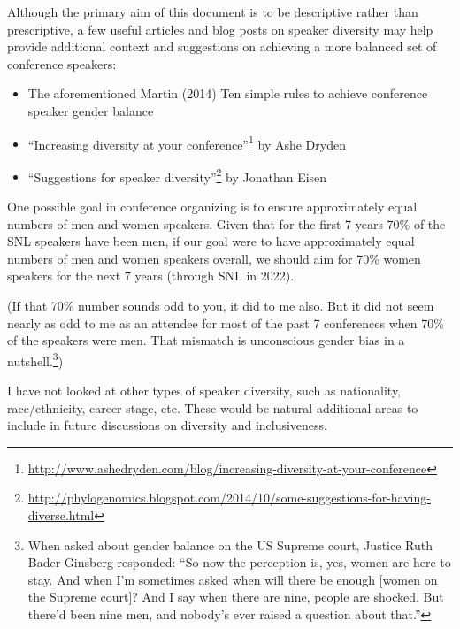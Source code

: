 \documentclass{winnower}
\begin{document}
Although the primary aim of this document is to be descriptive rather than prescriptive, a few useful articles and blog posts on speaker diversity may help provide additional context and suggestions on achieving a more balanced set of conference speakers:

\begin{itemize}

\item The aforementioned Martin (2014) Ten simple rules to achieve conference speaker gender balance
\item ``Increasing diversity at your conference''\footnote{\url{http://www.ashedryden.com/blog/increasing-diversity-at-your-conference}} by Ashe Dryden
\item ``Suggestions for speaker diversity''\footnote{\url{http://phylogenomics.blogspot.com/2014/10/some-suggestions-for-having-diverse.html}} by Jonathan Eisen

\end{itemize}

One possible goal in conference organizing is to ensure approximately equal numbers of men and women speakers. Given that for the first 7 years 70\% of the SNL speakers have been men, if our goal were to have approximately equal numbers of men and women speakers overall, we should aim for 70\% women speakers for the next 7 years (through SNL in 2022).

(If that 70\% number sounds odd to you, it did to me also. But it did not seem nearly as odd to me as an attendee for most of the past 7 conferences when 70\% of the speakers were men. That mismatch is unconscious gender bias in a nutshell.\footnote{When asked about gender balance on the US Supreme court, Justice Ruth Bader Ginsberg responded: ``So now the perception is, yes, women are here to stay. And when I'm sometimes asked when will there be enough [women on the Supreme court]? And I say when there are nine, people are shocked. But there'd been nine men, and nobody's ever raised a question about that.''})

I have not looked at other types of speaker diversity, such as nationality, race/ethnicity, career stage, etc. These would be natural additional areas to include in future discussions on diversity and inclusiveness.




\end{document}
